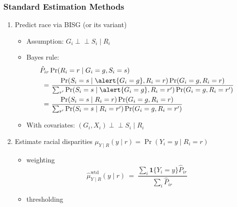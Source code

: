 \documentclass[handout]{beamer}
\newcommand{\indep}{\mbox{$\perp\!\!\!\perp$}}
\begin{document}
\begin{frame}

  \frametitle{Standard Estimation Methods}
 
\begin{enumerate}
\item Predict race via BISG (or its variant)
  \begin{itemize}
  \item Assumption: $G_i \indep  S_i \mid R_i$
  \item Bayes rule:
    \begin{align*}
      \hat{P}_{ir} & \Pr(R_i = r \mid G_i = g, S_i = s) \\
      = & \ \frac{\Pr(S_i =s\mid
      \alert{G_i =g}, R_i = r)\Pr(G_i =g, R_i =r)}{\sum_{r^\prime} \Pr(S_i =s\mid
          \alert{G_i =g}, R_i = r^\prime)\Pr(G_i =g, R_i =r^\prime)} \\
      = & \ \frac{\Pr(S_i =s\mid
       R_i = r)\Pr(G_i =g, R_i =r)}{\sum_{r^\prime} \Pr(S_i =s\mid
       R_i = r^\prime)\Pr(G_i =g, R_i =r^\prime)}
    \end{align*}
  \item With covariates: $(G_i, X_i) \indep S_i \mid R_i$
  \end{itemize}
  \vfill
\item Estimate racial disparities $\mu_{Y\mid R}(y \mid r) = \Pr(Y_i = y \mid R_i = r)$
  \begin{itemize}
  \item weighting
    $$\hat\mu_{Y\mid R}^{\text{wtd}}(y \mid r) \ = \ \frac{\sum_i \mathbf{1}\{Y_i = y\}\hat{P}_{ir} }{\sum_i \hat{P}_{ir}}$$
  \item thresholding
  \end{itemize}
\end{enumerate}

\end{frame}
\end{document}
